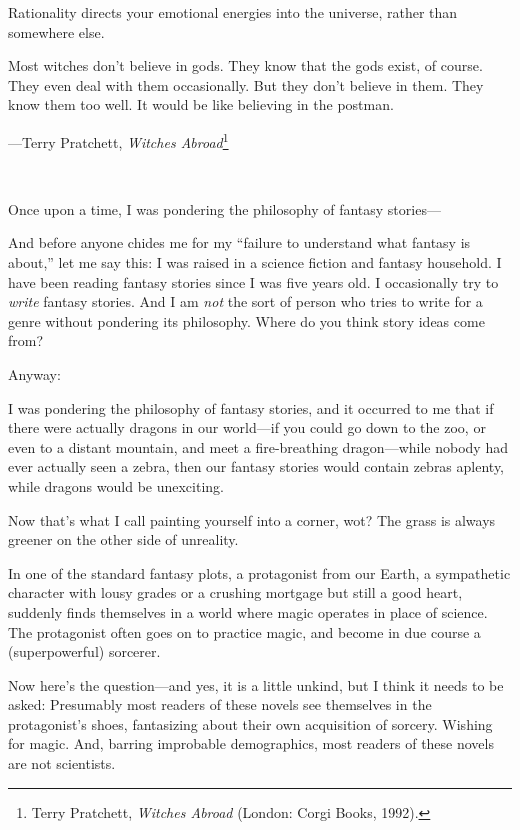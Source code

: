 {
 Rationality directs your emotional energies into the universe,
rather than somewhere else.}

\myendsectiontext


{
 Most witches don't believe in gods. They know that
the gods exist, of course. They even deal with them occasionally. But
they don't believe in them. They know them too well. It
would be like believing in the postman.}

{\raggedleft
 {}---Terry Pratchett, \textit{Witches Abroad}\footnote{Terry Pratchett, \textit{Witches Abroad} (London: Corgi Books,
1992).}
\par}


\bigskip

{
 ~}

{
 Once upon a time, I was pondering the philosophy of fantasy
stories---}

{
 And before anyone chides me for my ``failure to
understand what fantasy is about,'' let me say this:
I was raised in a science fiction and fantasy household. I have been
reading fantasy stories since I was five years old. I occasionally try
to \textit{write} fantasy stories. And I am \textit{not} the sort of
person who tries to write for a genre without pondering its philosophy.
Where do you think story ideas come from?}

{
 Anyway:}

{
 I was pondering the philosophy of fantasy stories, and it occurred
to me that if there were actually dragons in our world---if you could
go down to the zoo, or even to a distant mountain, and meet a
fire-breathing dragon---while nobody had ever actually seen a zebra,
then our fantasy stories would contain zebras aplenty, while dragons
would be unexciting.}

{
 Now that's what I call painting yourself into a
corner, wot? The grass is always greener on the other side of
unreality.}

{
 In one of the standard fantasy plots, a protagonist from our
Earth, a sympathetic character with lousy grades or a crushing mortgage
but still a good heart, suddenly finds themselves in a world where
magic operates in place of science. The protagonist often goes on to
practice magic, and become in due course a (superpowerful) sorcerer.}

{
 Now here's the question---and yes, it is a little
unkind, but I think it needs to be asked: Presumably most readers of
these novels see themselves in the protagonist's shoes,
fantasizing about their own acquisition of sorcery. Wishing for magic.
And, barring improbable demographics, most readers of these novels are
not scientists.}


